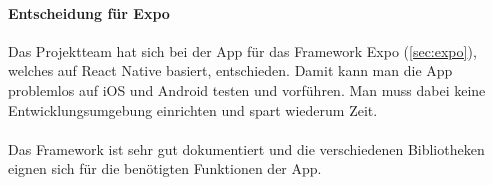 \paragraph{Entscheidung für Expo}Das Projektteam hat sich bei der App für das \Gls{Framework} Expo (\ref{sec:expo}), welches auf React Native basiert, entschieden. Damit kann man die App problemlos auf iOS und Android testen und vorführen. Man muss dabei keine Entwicklungsumgebung einrichten und spart wiederum Zeit.\\ \\
Das \Gls{Framework} ist sehr gut dokumentiert und die verschiedenen Bibliotheken eignen sich für die benötigten Funktionen der App.\\
